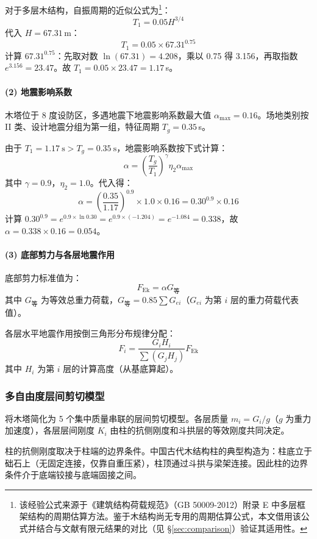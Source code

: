 \documentclass[12pt,a4paper,UTF8]{ctexart}
\begin{document}
对于多层木结构，自振周期的近似公式为\footnote{该经验公式来源于《建筑结构荷载规范》（GB 50009-2012）附录 E 中多层框架结构的周期估算方法。鉴于木结构尚无专用的周期估算公式，本文借用该公式并结合与文献有限元结果的对比（见 §\ref{sec:comparison}）验证其适用性。}：
\[
    T_1 = 0.05 H^{3/4}
\]
代入 $H = 67.31$\,m：
\[
    T_1 = 0.05 \times 67.31^{0.75}
\]
计算 $67.31^{0.75}$：先取对数 $\ln(67.31) = 4.208$，乘以 0.75 得 3.156，再取指数 $e^{3.156} = 23.47$。故 $T_1 = 0.05 \times 23.47 = 1.17$\,s。

\paragraph{(2) 地震影响系数}

木塔位于 8 度设防区，多遇地震下地震影响系数最大值 $\alpha_{\max} = 0.16$。场地类别按 II 类、设计地震分组为第一组，特征周期 $T_g = 0.35$\,s。

由于 $T_1 = 1.17\ \text{s} > T_g = 0.35\ \text{s}$，地震影响系数按下式计算：
\[
    \alpha = \left(\frac{T_g}{T_1}\right)^\gamma \eta_2 \alpha_{\max}
\]
其中 $\gamma = 0.9$，$\eta_2 = 1.0$。代入得：
\[
    \alpha = \left(\frac{0.35}{1.17}\right)^{0.9} \times 1.0 \times 0.16 = 0.30^{0.9} \times 0.16
\]
计算 $0.30^{0.9} = e^{0.9 \times \ln 0.30} = e^{0.9 \times (-1.204)} = e^{-1.084} = 0.338$，故 $\alpha = 0.338 \times 0.16 = 0.054$。

\paragraph{(3) 底部剪力与各层地震作用}

底部剪力标准值为：
\[
    F_{\text{Ek}} = \alpha G_{\text{等}}
\]
其中 $G_{\text{等}}$ 为等效总重力荷载，$G_{\text{等}} = 0.85 \sum G_{ei}$（$G_{ei}$ 为第 $i$ 层的重力荷载代表值）。

各层水平地震作用按倒三角形分布规律分配：
\[
    F_i = \frac{G_i H_i}{\sum(G_j H_j)} F_{\text{Ek}}
\]
其中 $H_i$ 为第 $i$ 层的计算高度（从基底算起）。

\subsubsection{多自由度层间剪切模型}

将木塔简化为 5 个集中质量串联的层间剪切模型。各层质量 $m_i = G_i / g$（$g$ 为重力加速度），各层层间刚度 $K_i$ 由柱的抗侧刚度和斗拱层的等效刚度共同决定。

柱的抗侧刚度取决于柱端的边界条件。中国古代木结构柱的典型构造为：柱底立于础石上（无固定连接，仅靠自重压紧），柱顶通过斗拱与梁架连接。因此柱的边界条件介于底端铰接与底端固接之间。
\end{document}

